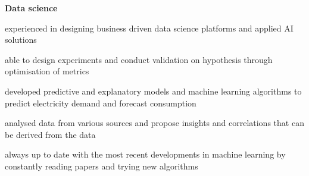 \documentclass[10pt]{article}
\newenvironment{innerlist}[1][\enskip\textperiodcentered
]%
        {\begin{compactitem}[#1]}{\end{compactitem}}
\newcommand{\blankline}{\quad\pagebreak[2]}
\begin{document}
\blankline

{\textbf{Data science}}
\begin{innerlist}
\item experienced in designing business driven data science platforms and applied AI solutions
\item able to design experiments and conduct validation on hypothesis through optimisation of metrics
\item developed predictive and explanatory models and machine learning algorithms to predict electricity demand and forecast consumption
\item analysed data from various sources and propose insights and correlations that can be derived from the data
\item always up to date with the most recent developments in machine learning by constantly reading papers and trying new algorithms
\end{innerlist}
\end{document}
